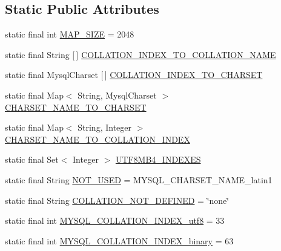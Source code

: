 \subsection*{Static Public Attributes}
\begin{DoxyCompactItemize}
\item 
static final int \mbox{\hyperlink{classcom_1_1mysql_1_1cj_1_1_charset_mapping_a9425e1f5843d162962dea3b0230181c1}{M\+A\+P\+\_\+\+S\+I\+ZE}} = 2048
\item 
static final String \mbox{[}$\,$\mbox{]} \mbox{\hyperlink{classcom_1_1mysql_1_1cj_1_1_charset_mapping_aaef0faa62527de38522133ab2bd7dc7f}{C\+O\+L\+L\+A\+T\+I\+O\+N\+\_\+\+I\+N\+D\+E\+X\+\_\+\+T\+O\+\_\+\+C\+O\+L\+L\+A\+T\+I\+O\+N\+\_\+\+N\+A\+ME}}
\item 
static final Mysql\+Charset \mbox{[}$\,$\mbox{]} \mbox{\hyperlink{classcom_1_1mysql_1_1cj_1_1_charset_mapping_a26d7028102246354923910a17e2e1ee4}{C\+O\+L\+L\+A\+T\+I\+O\+N\+\_\+\+I\+N\+D\+E\+X\+\_\+\+T\+O\+\_\+\+C\+H\+A\+R\+S\+ET}}
\item 
static final Map$<$ String, Mysql\+Charset $>$ \mbox{\hyperlink{classcom_1_1mysql_1_1cj_1_1_charset_mapping_a4e8f3b6a18adf7f56d95cd1678793808}{C\+H\+A\+R\+S\+E\+T\+\_\+\+N\+A\+M\+E\+\_\+\+T\+O\+\_\+\+C\+H\+A\+R\+S\+ET}}
\item 
static final Map$<$ String, Integer $>$ \mbox{\hyperlink{classcom_1_1mysql_1_1cj_1_1_charset_mapping_adc45544deed277897844cfad6a367a4c}{C\+H\+A\+R\+S\+E\+T\+\_\+\+N\+A\+M\+E\+\_\+\+T\+O\+\_\+\+C\+O\+L\+L\+A\+T\+I\+O\+N\+\_\+\+I\+N\+D\+EX}}
\item 
static final Set$<$ Integer $>$ \mbox{\hyperlink{classcom_1_1mysql_1_1cj_1_1_charset_mapping_a4d6abca534483a116a4255827b3f43e5}{U\+T\+F8\+M\+B4\+\_\+\+I\+N\+D\+E\+X\+ES}}
\item 
static final String \mbox{\hyperlink{classcom_1_1mysql_1_1cj_1_1_charset_mapping_ab5a568e79b06bf2c7598e8ec2cbb5ca6}{N\+O\+T\+\_\+\+U\+S\+ED}} = M\+Y\+S\+Q\+L\+\_\+\+C\+H\+A\+R\+S\+E\+T\+\_\+\+N\+A\+M\+E\+\_\+latin1
\item 
static final String \mbox{\hyperlink{classcom_1_1mysql_1_1cj_1_1_charset_mapping_a9eb3ea147d46febde2f4ce191db98728}{C\+O\+L\+L\+A\+T\+I\+O\+N\+\_\+\+N\+O\+T\+\_\+\+D\+E\+F\+I\+N\+ED}} = \char`\"{}none\char`\"{}
\item 
static final int \mbox{\hyperlink{classcom_1_1mysql_1_1cj_1_1_charset_mapping_ae2239d1170e14b584ff627fe59a2b4be}{M\+Y\+S\+Q\+L\+\_\+\+C\+O\+L\+L\+A\+T\+I\+O\+N\+\_\+\+I\+N\+D\+E\+X\+\_\+utf8}} = 33
\item 
static final int \mbox{\hyperlink{classcom_1_1mysql_1_1cj_1_1_charset_mapping_a8c5acfb9b1dcf8c7835a9c006280c3fc}{M\+Y\+S\+Q\+L\+\_\+\+C\+O\+L\+L\+A\+T\+I\+O\+N\+\_\+\+I\+N\+D\+E\+X\+\_\+binary}} = 63
\end{DoxyCompactItemize}


